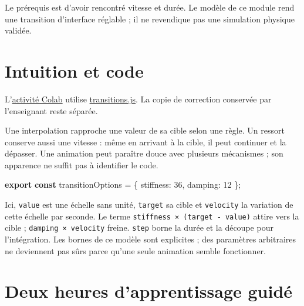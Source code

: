 \documentclass[
  canadien,
  11pt,
  a4paper,
]{report}
\newenvironment{Shaded}{}{}
\newcommand{\DataTypeTok}[1]{\textcolor[rgb]{0.56,0.13,0.00}{#1}}
\newcommand{\DecValTok}[1]{\textcolor[rgb]{0.25,0.63,0.44}{#1}}
\newcommand{\ImportTok}[1]{\textcolor[rgb]{0.00,0.50,0.00}{\textbf{#1}}}
\newcommand{\KeywordTok}[1]{\textcolor[rgb]{0.00,0.44,0.13}{\textbf{#1}}}
\newcommand{\NormalTok}[1]{#1}
\newcommand{\OperatorTok}[1]{\textcolor[rgb]{0.40,0.40,0.40}{#1}}
\begin{document}
Le prérequis est d'avoir rencontré vitesse et durée. Le modèle de ce
module rend une transition d'interface réglable ; il ne revendique pas
une simulation physique validée.

\section{Intuition et code}\label{intuition-et-code}

L'\href{../../notebooks/module-5.ipynb}{activité Colab} utilise
\href{../../frontend/module-5/transitions.js}{transitions.js}. La copie
de correction conservée par l'enseignant reste séparée.

Une interpolation rapproche une valeur de sa cible selon une règle. Un
ressort conserve aussi une vitesse : même en arrivant à la cible, il
peut continuer et la dépasser. Une animation peut paraître douce avec
plusieurs mécanismes ; son apparence ne suffit pas à identifier le code.

\begin{Shaded}
\begin{Highlighting}[]
\ImportTok{export} \KeywordTok{const}\NormalTok{ transitionOptions }\OperatorTok{=}\NormalTok{ \{ }\DataTypeTok{stiffness}\OperatorTok{:} \DecValTok{36}\OperatorTok{,} \DataTypeTok{damping}\OperatorTok{:} \DecValTok{12}\NormalTok{ \}}\OperatorTok{;}
\end{Highlighting}
\end{Shaded}

Ici, \texttt{value} est une échelle sans unité, \texttt{target} sa cible
et \texttt{velocity} la variation de cette échelle par seconde. Le terme
\texttt{stiffness\ ×\ (target\ -\ value)} attire vers la cible ;
\texttt{damping\ ×\ velocity} freine. \texttt{step} borne la durée et la
découpe pour l'intégration. Les bornes de ce modèle sont explicites ;
des paramètres arbitraires ne deviennent pas sûrs parce qu'une seule
animation semble fonctionner.

\section{Deux heures d'apprentissage
guidé}\label{deux-heures-dapprentissage-guiduxe9-4}
\end{document}
